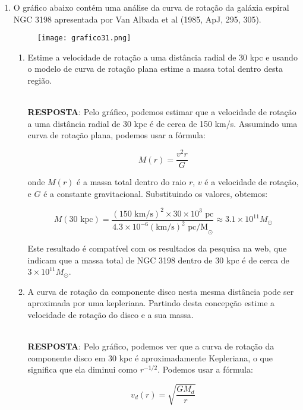 \documentclass[a4paper,12pt]{article}
\begin{document}
\begin{enumerate}
\begin{enumerate}
\noindent\hrulefill

\end{enumerate}

\item O gráfico abaixo contém uma análise da curva de rotação da galáxia 
espiral NGC 3198 apresentada por Van Albada et al (1985, ApJ, 295, 305).

\begin{figure}[H]
\centering
\texttt{[image: grafico31.png]}
\end{figure}

\begin{enumerate}

\item Estime a velocidade de rotação a uma distância radial de 30 kpc e 
usando o modelo de curva de rotação plana estime a massa total dentro 
desta região.

\noindent\hrulefill\\\textbf{RESPOSTA}: Pelo gráfico, podemos estimar que a velocidade de rotação a uma distância radial de 30 kpc é de cerca de 150 km/s. Assumindo uma curva de rotação plana, podemos usar a fórmula:

$$
M(r) = \frac{v^2 r}{G}
$$

onde $M(r)$ é a massa total dentro do raio $r$, $v$ é a velocidade de rotação, e $G$ é a constante gravitacional. Substituindo os valores, obtemos:

$$
M(30 \text{ kpc}) = \frac{(150 \text{ km/s})^2 \times 30 \times 10^3 \text{ pc}}{4.3 \times 10^{-6} (\text{km/s})^2 \text{ pc/M}_\odot} \approx 3.1 \times 10^{11} M_\odot
$$

Este resultado é compatível com os resultados da pesquisa na web, que indicam que a massa total de NGC 3198 dentro de 30 kpc é de cerca de $3 \times 10^{11} M_\odot$.

\noindent\hrulefill

\item A curva de rotação da componente disco nesta mesma distância pode ser 
aproximada por uma kepleriana. Partindo desta concepção estime a 
velocidade de rotação do disco e a sua massa.

\noindent\hrulefill\\\textbf{RESPOSTA}: Pelo gráfico, podemos ver que a curva de rotação da componente disco em 30 kpc é aproximadamente Kepleriana, o que significa que ela diminui como $r^{-1/2}$. Podemos usar a fórmula:

$$
v_d(r) = \sqrt{\frac{G M_d}{r}}
$$


\end{enumerate}
\end{enumerate}
\end{document}
